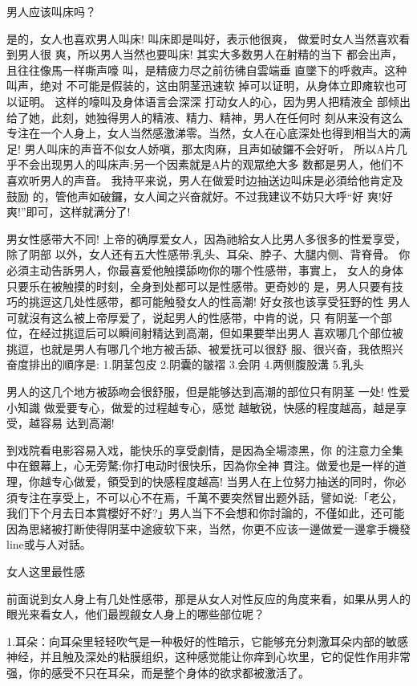 \documentclass[12pt,UTF8]{ctexbook}
\begin{document}
男人应该叫床吗？

是的，女人也喜欢男人叫床!
叫床即是叫好，表示他很爽，
做爱时女人当然喜欢看到男人很
爽，所以男人当然也要叫床!
其实大多数男人在射精的当下
都会出声，且往往像馬一样嘶声嚎
叫，是精疲力尽之前彷彿自雲端垂
直墜下的呼救声。这种叫声，绝对
不可能是假装的，这由阴茎迅速软
掉可以证明，从身体立即瘫软也可
以证明。
这样的嚎叫及身体语言会深深
打动女人的心，因为男人把精液全
部倾出给了她，此刻，她独得男人的精液、精力、精神，男人在任何时
刻从来没有这么专注在一个人身上，女人当然感激涕零。当然，女人在心底深处也得到相当大的满足!
男人叫床的声音不似女人娇嗔，那太肉麻，且声如破鑼不会好听，
所以A片几乎不会出现男人的叫床声;另一个因素就是A片的观眾绝大多
数都是男人，他们不喜欢听男人的声音。
我持平来说，男人在做爱时边抽送边叫床是必須给他肯定及鼓励
的，管他声如破鑼，女人闻之兴奋就好。不过我建议不妨只大呼“好
爽!好爽!”即可，这样就满分了!

男女性感带大不同!
上帝的确厚爱女人，因為祂給女人比男人多很多的性爱享受，除了阴部
以外，女人还有五大性感带:乳头、耳朵、脖子、大腿内侧、背脊骨。
你必須主动告訴男人，你最喜爱他触摸舔吻你的哪个性感带，事實上，
女人的身体只要乐在被触摸的时刻，全身到处都可以是性感带。更奇妙的
是，男人只要有技巧的挑逗这几处性感带，都可能触發女人的性高潮!
好女孩也该享受狂野的性
男人可就沒有这么被上帝厚爱了，说起男人的性感带，中肯的说，只
有阴茎一个部位，在经过挑逗后可以瞬间射精达到高潮，但如果要举出男人
喜欢哪几个部位被挑逗，也就是男人有哪几个地方被舌舔、被爱抚可以很舒
服、很兴奋，我依照兴奋度排出的順序是:
1.阴茎包皮
2.阴囊的皺褶
3.会阴
4.两侧腹股溝
5.乳头

男人的这几个地方被舔吻会很舒服，但是能够达到高潮的部位只有阴茎
一处!
性爱小知識
做爱要专心，做爱的过程越专心，感觉
越敏锐，快感的程度越高，越是享受，越容易
达到高潮!

到戏院看电影容易入戏，能快乐的享受劇情，是因為全場漆黑，你
的注意力全集中在銀幕上，心无旁騖;你打电动时很快乐，因為你全神
貫注。做爱也是一样的道理，你越专心做爱，領受到的快感程度越高!
当男人在上位努力抽送的同时，你必須专注在享受上，不可以心不在焉，千萬不要突然冒出题外話，譬如说:「老公，我们下个月去日本賞櫻好不好?」男人当下不会想和你討論的，不僅如此，还可能因為思緒被打断使得阴茎中途疲软下来，当然，你更不应该一邊做爱一邊拿手機發line或与人对話。

女人这里最性感

前面说到女人身上有几处性感带，那是从女人对性反应的角度来看，如果从男人的眼光来看女人，他们最觊觎女人身上的哪些部位呢？

1.耳朵：向耳朵里轻轻吹气是一种极好的性暗示，它能够充分刺激耳朵内部的敏感神经，并且触及深处的粘膜组织，这种感觉能让你痒到心坎里，它的促性作用非常强，你的感受不只在耳朵，而是整个身体的欲求都被激活了。
\end{document}
